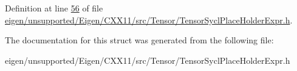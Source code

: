 Definition at line \hyperlink{eigen_2unsupported_2_eigen_2_c_x_x11_2src_2_tensor_2_tensor_sycl_place_holder_expr_8h_source_l00056}{56} of file \hyperlink{eigen_2unsupported_2_eigen_2_c_x_x11_2src_2_tensor_2_tensor_sycl_place_holder_expr_8h_source}{eigen/unsupported/\+Eigen/\+C\+X\+X11/src/\+Tensor/\+Tensor\+Sycl\+Place\+Holder\+Expr.\+h}.



The documentation for this struct was generated from the following file\+:\begin{DoxyCompactItemize}
\item 
eigen/unsupported/\+Eigen/\+C\+X\+X11/src/\+Tensor/\+Tensor\+Sycl\+Place\+Holder\+Expr.\+h\end{DoxyCompactItemize}
